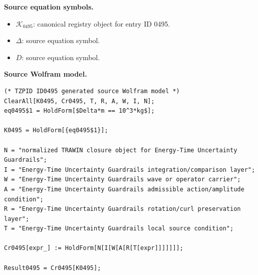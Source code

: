 \begin{minipage}[t]{0.49\linewidth}
\begingroup
\small
\raggedright
\textbf{Source equation symbols.}\par
\begin{itemize}[leftmargin=1.35em,itemsep=1pt,topsep=1pt,parsep=0pt]
    \item $\mathcal{K}_{0495}$: canonical registry object for entry ID 0495.
    \item $\Delta$: source equation symbol.
    \item $D$: source equation symbol.
\end{itemize}
\endgroup
\end{minipage}\hfill
\begin{minipage}[t]{0.47\linewidth}
\begingroup
\scriptsize
\raggedright
\textbf{Source Wolfram model.}\par
\begin{Verbatim}[fontsize=\tiny,breaklines=true,breakanywhere=true]
(* TZPID ID0495 generated source Wolfram model *)
ClearAll[K0495, Cr0495, T, R, A, W, I, N];
eq0495$1 = HoldForm[$Delta*m == 10^3*kg$];

K0495 = HoldForm[{eq0495$1}];

N = "normalized TRAWIN closure object for Energy-Time Uncertainty Guardrails";
I = "Energy-Time Uncertainty Guardrails integration/comparison layer";
W = "Energy-Time Uncertainty Guardrails wave or operator carrier";
A = "Energy-Time Uncertainty Guardrails admissible action/amplitude condition";
R = "Energy-Time Uncertainty Guardrails rotation/curl preservation layer";
T = "Energy-Time Uncertainty Guardrails local source condition";

Cr0495[expr_] := HoldForm[N[I[W[A[R[T[expr]]]]]]];

Result0495 = Cr0495[K0495];
\end{Verbatim}
\endgroup
\end{minipage}

